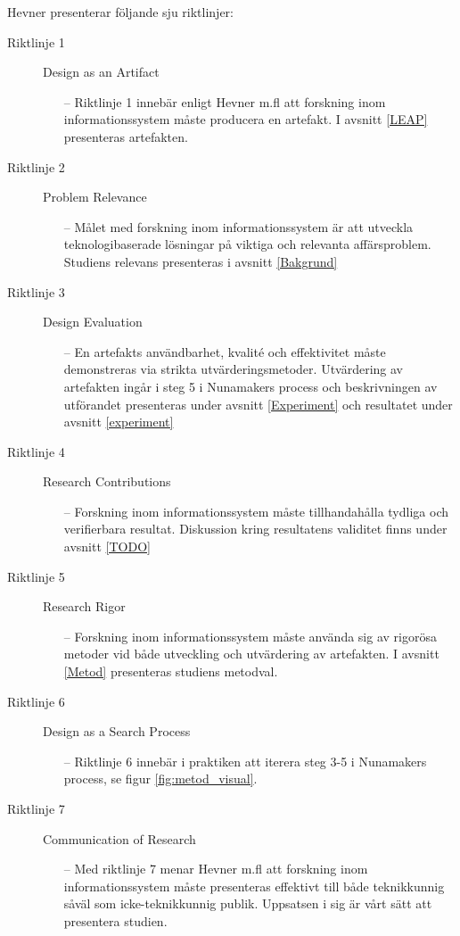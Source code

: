 \documentclass[a4paper,11pt]{article}
\begin{document}
{Hevner \cite{hevner} presenterar följande sju riktlinjer: 

\begin{description}
    \item [Riktlinje 1]
    Design as an Artifact
    \begin{itemize}
    \item [--] Riktlinje 1 innebär enligt Hevner m.fl att forskning inom informationssystem måste producera en artefakt. I avsnitt \ref{LEAP} presenteras artefakten.
    \end{itemize}
    \item [Riktlinje 2]
    Problem Relevance
     \begin{itemize}
    \item [--] Målet med forskning inom informationssystem är att utveckla teknologibaserade lösningar på viktiga och relevanta affärsproblem. Studiens relevans presenteras i avsnitt \ref{Bakgrund}
    \end{itemize}
    \item [Riktlinje 3]
    Design Evaluation
     \begin{itemize}
    \item [--] En artefakts användbarhet, kvalité och effektivitet måste demonstreras via strikta utvärderingsmetoder. Utvärdering av artefakten ingår i steg 5 i Nunamakers process och beskrivningen av utförandet presenteras under avsnitt \ref{Experiment} och resultatet under avsnitt \ref{experiment} 
    \end{itemize}
    \item [Riktlinje 4]
    Research Contributions
     \begin{itemize}
    \item [--] Forskning inom informationssystem måste tillhandahålla tydliga och verifierbara resultat. Diskussion kring resultatens validitet finns under avsnitt \ref{TODO}
    \end{itemize}
    \item [Riktlinje 5]
    Research Rigor
     \begin{itemize}
    \item [--] Forskning inom informationssystem måste använda sig av rigorösa metoder vid både utveckling och utvärdering av artefakten. I avsnitt \ref{Metod} presenteras studiens metodval.
    \end{itemize}
    \item [Riktlinje 6]
    Design as a Search Process
     \begin{itemize}
    \item [--] Riktlinje 6 innebär i praktiken att iterera steg 3-5 i Nunamakers process, se figur \ref{fig:metod_visual}. 
    \end{itemize}
    \item [Riktlinje 7]
    Communication of Research
     \begin{itemize}
    \item [--] Med riktlinje 7 menar Hevner m.fl att forskning inom informationssystem måste presenteras effektivt till både teknikkunnig såväl som icke-teknikkunnig publik. Uppsatsen i sig är vårt sätt att presentera studien. 
    \end{itemize}
\end{description}

}
\end{document}
